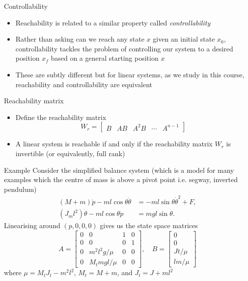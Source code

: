 \documentclass{beamer-control}
\begin{document}
\begin{frame}{Controllability}
	\begin{itemize}
		\item Reachability is related to a similar property called \textit{controllability}
		\item Rather than asking can we reach any state $x$ given an initial state $x_0$, controllability tackles the problem of controlling our system to a desired position $x_f$ based on a general starting position $x$
		\item These are subtly different but for linear systems, as we study in this course, reachability and controllability are equivalent
	\end{itemize}
\end{frame}



\begin{frame}{Reachability matrix}
	\begin{itemize}
		\item Define the reachability matrix
		\[W_r = \begin{bmatrix}
			B & AB & A^2 B & \cdots & A^{n-1}
		\end{bmatrix}\]
		\item A linear system is reachable if and only if the reachability matrix $W_r$ is invertible (or equivalently, full rank)
	\end{itemize}

\end{frame}

\begin{frame}{Example}
	Consider the simplified balance system (which is a model for many examples which the centre of mass is above a pivot point i.e. segway, inverted pendulum)
	\begin{align*}
		(M+m)\ddot{p}-ml\cos \theta \ddot{\theta} &= -ml\sin\theta \dot{\theta}^2+F,\\
		(J_ml^2)\ddot{\theta} -ml\cos \theta \ddot{p} &= mgl\sin \theta.
	\end{align*}
	Linearising around $(p,0,0,0)$ gives us the state space matrices
	\[ A=\begin{bmatrix}
		0 & 0 & 1 & 0\\
		0 & 0 & 0 & 1\\
		0 & m^2l^2g/\mu & 0 & 0 \\ 0& M_tmgl/\mu & 0 & 0
	\end{bmatrix}, \quad
	B = \begin{bmatrix}
		0 \\ 0 \\ Jt/\mu \\ lm/\mu
	\end{bmatrix}\]
	where $\mu=M_tJ_t-m^2l^2$, $M_t=M+m$, and $J_t=J+ml^2$
\end{frame}
\end{document}
